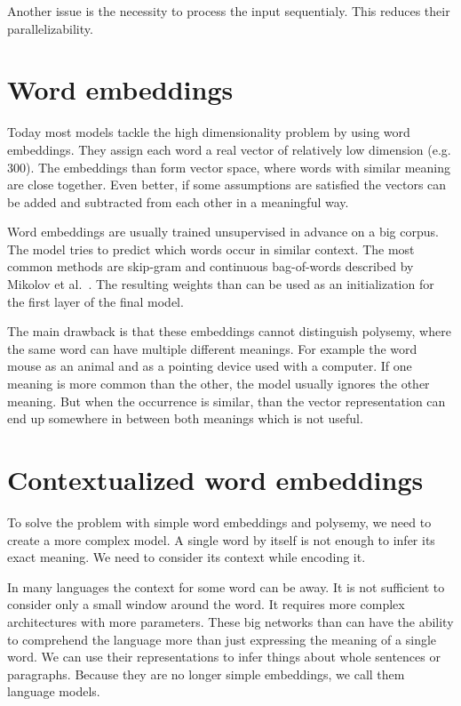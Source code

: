 \documentclass[
  digital, %
  table,   %
  twoside, %
  lof,     %
  lot,     %
]{fithesis3}
\begin{document}
Another issue is the necessity to process the input sequentialy. This reduces their parallelizability. 

\section{Word embeddings}
Today most models tackle the high dimensionality problem by using word embeddings.  They assign each word a real vector of relatively low dimension (e.g. 300). The embeddings than form vector space, where words with similar meaning are close together. Even better, if some assumptions are satisfied \cite{vectadd} the vectors can be added and subtracted from each other in a meaningful way.  

Word embeddings are usually trained unsupervised in advance on a big corpus. The model tries to predict which words occur in similar context. The most common methods are skip-gram and continuous bag-of-words described by Mikolov et al.~\parencite{mikolov}. The resulting weights than can be used as an initialization for the first layer of the final model.

The main drawback is that these embeddings cannot distinguish polysemy, where the same word can have multiple different meanings. For example the word mouse as an animal and as a pointing device used with a computer. If one meaning is more common than the other, the model usually ignores the other meaning. But when the occurrence is similar, than the vector representation can end up somewhere in between both meanings which is not useful.

\section{Contextualized word embeddings}
To solve the problem with simple word embeddings and polysemy, we need to create a more complex model. A single word by itself is not enough to infer its exact meaning. We need to consider its context while encoding it. 

In many languages the context for some word can be away. It is not sufficient to consider only a small window around the word. It requires more complex architectures with more parameters. These big networks than can have the ability to comprehend the language more than just expressing the meaning of a single word. We can use their representations to infer things about whole sentences or paragraphs. Because they are no longer simple embeddings, we call them language models.
\end{document}

